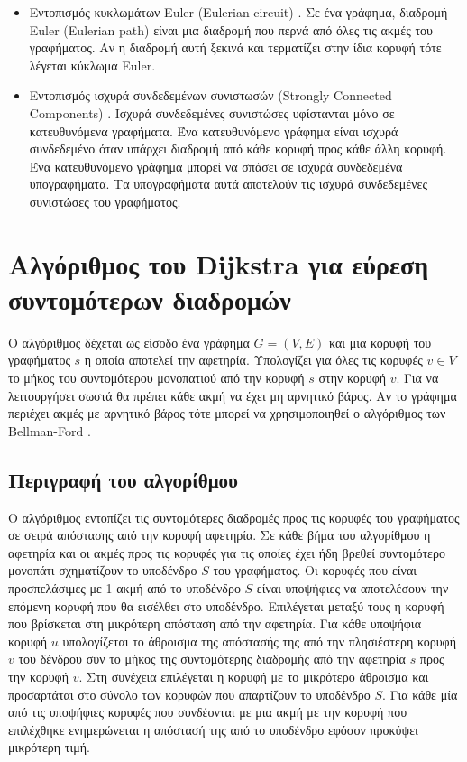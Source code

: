 \begin{itemize}[noitemsep]
	\item Εντοπισμός κυκλωμάτων Euler (Eulerian circuit) \cite{dicretetext_euler_path}. Σε ένα γράφημα, διαδρομή Euler (Eulerian path) είναι μια διαδρομή που περνά από όλες τις ακμές του γραφήματος. Αν η διαδρομή αυτή ξεκινά και τερματίζει στην ίδια κορυφή τότε λέγεται κύκλωμα Euler. 
	\item Εντοπισμός ισχυρά συνδεδεμένων συνιστωσών (Strongly Connected Components) \cite{he_scc}. Ισχυρά συνδεδεμένες συνιστώσες υφίστανται μόνο σε κατευθυνόμενα γραφήματα. Ένα κατευθυνόμενο γράφημα είναι ισχυρά συνδεδεμένο όταν υπάρχει διαδρομή από κάθε κορυφή προς κάθε άλλη κορυφή. Ένα κατευθυνόμενο γράφημα μπορεί να σπάσει σε ισχυρά συνδεδεμένα υπογραφήματα. Τα υπογραφήματα αυτά αποτελούν τις ισχυρά συνδεδεμένες συνιστώσες του γραφήματος.
\end{itemize} 

 
\section{Αλγόριθμος του Dijkstra για εύρεση συντομότερων διαδρομών}
Ο αλγόριθμος δέχεται ως είσοδο ένα γράφημα $G=(V,E)$ και μια κορυφή του γραφήματος $s$ η οποία αποτελεί την αφετηρία. Υπολογίζει για όλες τις κορυφές $v \in V$ το μήκος του συντομότερου μονοπατιού από την κορυφή $s$ στην κορυφή $v$. Για να λειτουργήσει σωστά θα πρέπει κάθε ακμή να έχει μη αρνητικό βάρος. Αν το γράφημα περιέχει ακμές με αρνητικό βάρος τότε μπορεί να χρησιμοποιηθεί ο αλγόριθμος των Bellman-Ford \cite{brilliant_bellman_ford}.

\subsection{Περιγραφή του αλγορίθμου}
Ο αλγόριθμος εντοπίζει τις συντομότερες διαδρομές προς τις κορυφές του γραφήματος σε σειρά απόστασης από την κορυφή αφετηρία. Σε κάθε βήμα του αλγορίθμου η αφετηρία και οι ακμές προς τις κορυφές για τις οποίες έχει ήδη βρεθεί συντομότερο μονοπάτι σχηματίζουν το υποδένδρο $S$ του γραφήματος. Οι κορυφές που είναι προσπελάσιμες με 1 ακμή από το υποδένδρο $S$ είναι υποψήφιες να αποτελέσουν την επόμενη κορυφή που θα εισέλθει στο υποδένδρο. Επιλέγεται μεταξύ τους η κορυφή που βρίσκεται στη μικρότερη απόσταση από την αφετηρία. Για κάθε υποψήφια κορυφή $u$ υπολογίζεται το άθροισμα της απόστασής της από την πλησιέστερη κορυφή $v$ του δένδρου συν το μήκος της συντομότερης διαδρομής από την αφετηρία $s$ προς την κορυφή $v$. Στη συνέχεια επιλέγεται η κορυφή με το μικρότερο άθροισμα και προσαρτάται στο σύνολο των κορυφών που απαρτίζουν το υποδένδρο $S$. Για κάθε μία από τις υποψήφιες κορυφές που συνδέονται με μια ακμή με την κορυφή που επιλέχθηκε ενημερώνεται η απόστασή της από το υποδένδρο εφόσον προκύψει μικρότερη τιμή.

